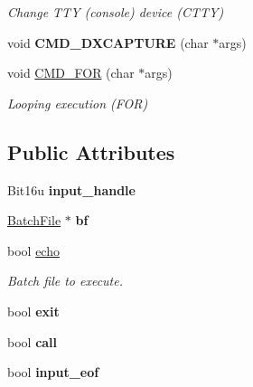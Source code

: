 \begin{DoxyCompactItemize}
\begin{DoxyCompactList}\small\item\em Change T\-T\-Y (console) device (C\-T\-T\-Y) \end{DoxyCompactList}\item 
\hypertarget{classDOS__Shell_af83074f3b9cbccf5265a95ad780311e5}{void {\bfseries C\-M\-D\-\_\-\-D\-X\-C\-A\-P\-T\-U\-R\-E} (char $\ast$args)}\label{classDOS__Shell_af83074f3b9cbccf5265a95ad780311e5}

\item 
\hypertarget{classDOS__Shell_a0d8acfd37eae2734a4a2cf623eafa536}{void \hyperlink{classDOS__Shell_a0d8acfd37eae2734a4a2cf623eafa536}{C\-M\-D\-\_\-\-F\-O\-R} (char $\ast$args)}\label{classDOS__Shell_a0d8acfd37eae2734a4a2cf623eafa536}

\begin{DoxyCompactList}\small\item\em Looping execution (F\-O\-R) \end{DoxyCompactList}\end{DoxyCompactItemize}
\subsection*{Public Attributes}
\begin{DoxyCompactItemize}
\item 
\hypertarget{classDOS__Shell_ae7e99ec60f0525ac0b2824e2ae020fa2}{Bit16u {\bfseries input\-\_\-handle}}\label{classDOS__Shell_ae7e99ec60f0525ac0b2824e2ae020fa2}

\item 
\hypertarget{classDOS__Shell_a812e2fbcc49d3523e5939235c1784a8f}{\hyperlink{classBatchFile}{Batch\-File} $\ast$ {\bfseries bf}}\label{classDOS__Shell_a812e2fbcc49d3523e5939235c1784a8f}

\item 
\hypertarget{classDOS__Shell_ab4ee052352ed1dedccf0854bcacadac2}{bool \hyperlink{classDOS__Shell_ab4ee052352ed1dedccf0854bcacadac2}{echo}}\label{classDOS__Shell_ab4ee052352ed1dedccf0854bcacadac2}

\begin{DoxyCompactList}\small\item\em Batch file to execute. \end{DoxyCompactList}\item 
\hypertarget{classDOS__Shell_ad687b7ce53d445c65c56891acd4aa660}{bool {\bfseries exit}}\label{classDOS__Shell_ad687b7ce53d445c65c56891acd4aa660}

\item 
\hypertarget{classDOS__Shell_a97d3128aca26624607d9e3acd183cfae}{bool {\bfseries call}}\label{classDOS__Shell_a97d3128aca26624607d9e3acd183cfae}

\item 
\hypertarget{classDOS__Shell_afe355c7cf53320fef3c696ee73d4de47}{bool {\bfseries input\-\_\-eof}}\label{classDOS__Shell_afe355c7cf53320fef3c696ee73d4de47}

\end{DoxyCompactItemize}
